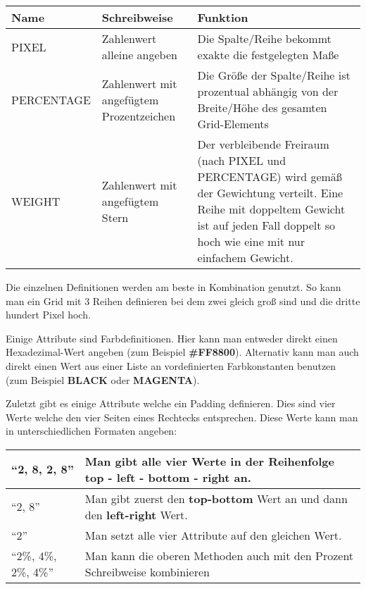 \begin{center}
\begin{tabularx}{\textwidth}{|l|l|X|} 
\hline
Name & Schreibweise & Funktion \\
\hline\hline
PIXEL & Zahlenwert alleine angeben & Die Spalte/Reihe bekommt exakte die festgelegten Maße \\
\hline
PERCENTAGE &  Zahlenwert mit angefügtem Prozentzeichen & Die Größe der Spalte/Reihe ist prozentual abhängig von der Breite/Höhe des gesamten Grid-Elements\\
\hline
WEIGHT & Zahlenwert mit angefügtem Stern & Der verbleibende Freiraum (nach PIXEL und PERCENTAGE) wird gemäß der Gewichtung verteilt. Eine Reihe mit doppeltem Gewicht ist auf jeden Fall doppelt so hoch wie eine mit nur einfachem Gewicht.\\
\hline
\end{tabularx}
\end{center}

Die einzelnen Definitionen werden am beste in Kombination genutzt. So kann man ein Grid mit 3 Reihen definieren bei dem zwei gleich groß sind und die dritte hundert Pixel hoch.

Einige Attribute sind Farbdefinitionen. Hier kann man entweder direkt einen Hexadezimal-Wert angeben (zum Beispiel \textbf{\#FF8800}). Alternativ kann man auch direkt einen Wert aus einer Liste an vordefinierten Farbkonstanten benutzen (zum Beispiel \textbf{BLACK} oder \textbf{MAGENTA}).

Zuletzt gibt es einige Attribute welche ein Padding definieren. Dies sind vier Werte welche den vier Seiten eines Rechtecks entsprechen. Diese Werte kann man in unterschiedlichen Formaten angeben:

\begin{center}
\begin{tabularx}{\textwidth}{|l|l|} 
\hline
``2, 8, 2, 8'' &  Man gibt alle vier Werte in der Reihenfolge \textbf{top} - \textbf{left} - \textbf{bottom} - \textbf{right} an. \\
\hline
``2, 8'' &  Man gibt zuerst den \textbf{top-bottom} Wert an und dann den \textbf{left-right} Wert.\\
\hline
``2'' &  Man setzt alle vier Attribute auf den gleichen Wert.\\
\hline
``2\%, 4\%, 2\%, 4\%'' &  Man kann die oberen Methoden auch mit den Prozent Schreibweise kombinieren\\
\hline
\end{tabularx}
\end{center}

